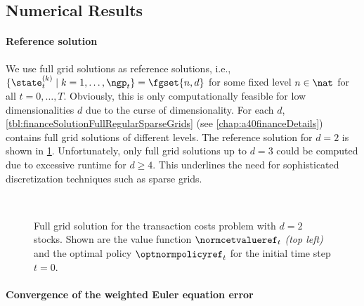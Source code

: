 \subsection{Numerical Results}
\label{sec:843results}

\paragraph{Reference solution}

We use full grid solutions as reference solutions,
i.e., $\{\state_t^{(k)} \mid k = 1, \dotsc, \ngp_t\} = \fgset{n,d}$
for some fixed level $n \in \nat$ for all $t = 0, \dotsc, T$.
Obviously, this is only computationally feasible
for low dimensionalities $d$ due to the curse of dimensionality.
For each $d$,
\cref{tbl:financeSolutionFullRegularSparseGrids}
(see \cref{chap:a40financeDetails})
contains full grid solutions of different levels.
The reference solution for $d = 2$ is shown in
\cref{fig:financeSolution2DReference}.
Unfortunately, only full grid solutions up to $d = 3$ could be computed
due to excessive runtime for $d \ge 4$.
This underlines the need for sophisticated
discretization techniques such as sparse grids.

\begin{figure}
  \hfill%
  \hfill%
  \\[1mm]%
  \hfill%
  \hfill%
  \caption[Reference solution for the two-dimensional TCP]{%
    Full grid solution for the transaction costs problem
    with $d = 2$ stocks.
    Shown are the value function $\normcetvalueref_t$ \emph{(top left)} and the
    optimal policy $\optnormpolicyref_t$ for the initial time step $t = 0$.%
  }%
  \label{fig:financeSolution2DReference}%
\end{figure}

\paragraph{Convergence of the weighted Euler equation error}

